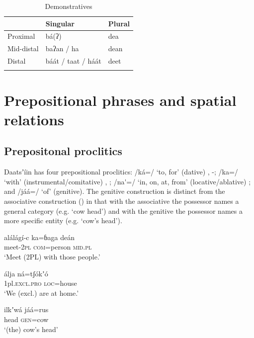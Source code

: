 \documentclass[output=paper]{langsci/langscibook}
\begin{document}
\begin{table}
\begin{tabularx}{\textwidth}{XXX} 
\lsptoprule & Singular &  Plural\\
\midrule
 Proximal &  b\'{a}(ʔ) & dea\\
 Mid-distal & baʔan / ha &  dean\\
Distal & b\'{a}\'{a}t / taat / h\'{a}\'{a}t & deet\\
\lspbottomrule
\end{tabularx}
\caption{Demonstratives}
\label{tab:ahlandc:11}
\end{table}

\section{Prepositional phrases and spatial relations}\label{sec:ahlandc:10}

\subsection{Prepositonal proclitics}\label{sec:ahlandc:10.1}

Daatsʼ\'{i}in has four prepositional proclitics: /k\'{a}=/ ‘to, for’ (dative) , -; /ka=/ ‘with’ (instrumental/comitative) , ; /na\'{ }=/ ‘in, on, at, from’ (locative/ablative) ; and /j\'{a}\'{a}=/ ‘of’ (genitive).  The genitive construction  is distinct from the associative construction () in that with the associative the possessor names a general category (e.g. ‘cow head’) and with the genitive the possessor names a more specific entity (e.g. ‘cow’s head’).

\ea\label{ex:ahlandc:56}
\gll
al\'{a}l\'{a}g\'{i}-c  ka=ɓaga  de\'{a}n    \\
meet-\textsc{2pl}   \textsc{com}=person  \textsc{mid.pl} \\
\glt
‘Meet (2PL) with those people.’
\z

\ea\label{ex:ahlandc:57}
\gll
\'{a}lja  n\'{a}=tʃ\'{o}kʼ\'{o} \\
1pl\textsc{.excl.pro}   \textsc{loc}=house \\
\glt
‘We (excl.) are at home.’
\z

\ea\label{ex:ahlandc:58}
\gll
ilkʼw\'{a}  j\'{a}\'{a}=rus \\
head   \textsc{gen}=cow \\
\glt
‘(the) cow’s head’
\z
\end{document}

